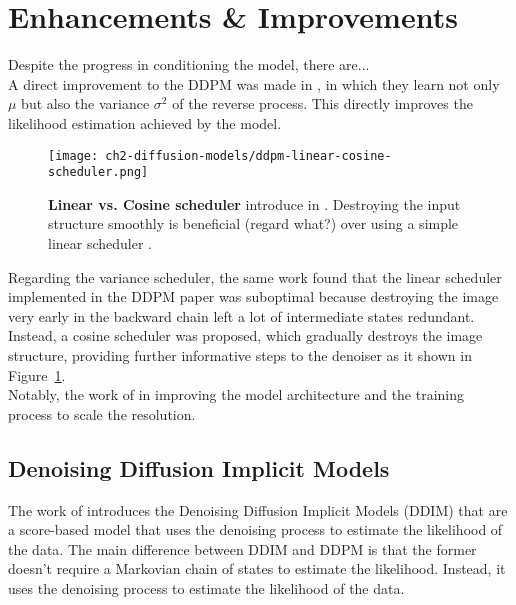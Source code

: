 \section{Enhancements \& Improvements}

Despite the progress in conditioning the model, there are...\\

A direct improvement to the DDPM was made in \cite{nichol2021improved}, in which they learn not only $\mu$ but also the variance $\sigma^{2}$ of the reverse process. This directly improves the likelihood estimation achieved by the model. \\

\begin{figure}[ht]
    \centering
    \texttt{[image: ch2-diffusion-models/ddpm-linear-cosine-scheduler.png]}
    \captionsetup{width=\textwidth} %
    \caption{\textbf{Linear vs. Cosine scheduler} introduce in \cite{nichol2021improved}. Destroying the input structure smoothly is beneficial (regard what?) over using a simple linear scheduler .}
    \label{fig:ddpm-linear-vs-cosine-scheduler}
  \end{figure}

Regarding the variance scheduler, the same work found that the linear scheduler implemented in the DDPM paper was suboptimal because destroying the image very early in the backward chain left a lot of intermediate states redundant. Instead, a cosine scheduler was proposed, which gradually destroys the image structure, providing further informative steps to the denoiser as it shown in Figure~\ref{fig:ddpm-linear-vs-cosine-scheduler}. \\

Notably, the work of \cite{rombach2022highresolution} in improving the model architecture and the training process to scale the resolution.

\subsection{Denoising Diffusion Implicit Models}

The work of \cite{song2020denoising} introduces the Denoising Diffusion Implicit Models (DDIM) that are a score-based model that uses the denoising process to estimate the likelihood of the data. The main difference between DDIM and DDPM is that the former doesn't require a Markovian chain of states to estimate the likelihood. Instead, it uses the denoising process to estimate the likelihood of the data.\\

